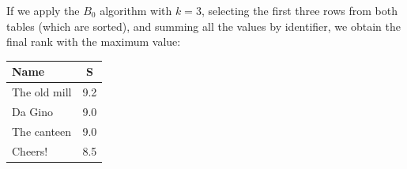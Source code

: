\begin{example}
\begin{table}[H]
    \end{table}
    If we apply the $B_0$ algorithm with $k=3$, selecting the first three rows from both tables (which are sorted), and summing all the values by identifier, we obtain the final rank with the maximum value:
    \begin{table}[H]
        \centering
        \begin{tabular}{|lc|}
        \hline
        \textbf{Name} & \textbf{S} \\ \hline
        The old mill  & 9.2        \\ 
        Da Gino       & 9.0        \\ 
        The canteen   & 9.0        \\ 
        Cheers!       & 8.5        \\ \hline
        \end{tabular}
    \end{table}
\end{example}

